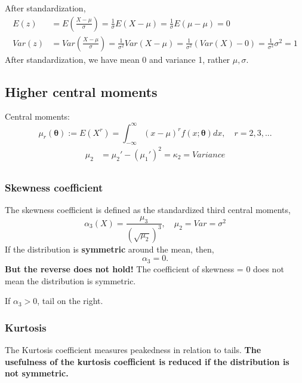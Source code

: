 \documentclass[12pt]{article}
\newcommand{\incfig}[1]{%
\def\svgwidth{\columnwidth}
{#1.pdf_tex}
}
\begin{document}
After standardization,
\begin{align*}
E(z) &= E \left( \frac{X - \mu}{\sigma} \right)  = \frac{1}{\sigma}E(X - \mu) = \frac{1}{\sigma}
E(\mu - \mu) = 0\\
Var(z)&= Var \left( \frac{X - \mu}{\sigma} \right) = \frac{1}{\sigma^{2}}Var(X - \mu)=
\frac{1}{\sigma^{2}}(Var(X) - 0) = \frac{1}{\sigma^{2}}\sigma^{2} = 1
\end{align*}
After standardization, we have mean 0 and variance 1, rather $ \mu, \sigma $.



\subsection{Higher central moments}

Central moments:
\begin{equation*}
\mu_{r}(\bm{\theta}):=E(X^{r}) = \int_{ - \infty }^{\infty } (x - \mu)^{r}f(x;
\bm{\theta})dx, \quad r = 2,3,...
\end{equation*}
\begin{align*}
\mu_2 &= \mu_2' - (\mu_1')^{2} = \kappa_2 = Variance\\
\end{align*}

\subsubsection{Skewness coefficient}
The skewness coefficient is defined as the standardized third central moments,
\begin{equation*}
\alpha_3(X) = \frac{\mu_3}{(\sqrt {\mu_2})^{3}},\quad \mu_2 = Var = \sigma^{2}
\end{equation*}
If the distribution is {\textbf {symmetric}} around the mean, then,
\begin{equation*}
\alpha_3 = 0.
\end{equation*}
{\textbf {But the reverse does not hold!}} The coefficient of skewness = 0 does not mean
the distribution is symmetric.

If $ \alpha_3 > 0 $, tail on the right.
\begin{figure}[ht]
    \centering
		\scalebox{.7}{\incfig{right-tail}}
    \label{fig:right-tail}
\end{figure}



\subsubsection{Kurtosis}
The Kurtosis coefficient measures peakedness in relation to tails. 
{\textbf {The usefulness of the kurtosis coefficient is reduced if the distribution
is not symmetric.}}
\end{document}
